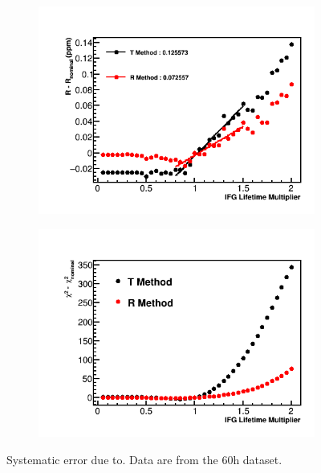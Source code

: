 \begin{figure}[h]
\centering
    \begin{subfigure}[t]{0.45\textwidth}
        \centering
        \includegraphics[width=\textwidth]{IFG_Lifetime_Compare_R}
        \caption{}
    \end{subfigure}%
    \hspace{1cm}
    \begin{subfigure}[t]{0.45\textwidth}
        \centering
        \includegraphics[width=\textwidth]{IFG_Lifetime_Compare_Chisq}
        \caption{}
    \end{subfigure}
\caption[Systematic error due to]{Systematic error due to. Data are from the 60h dataset.}
\label{fig:IFGAmpscan}
\end{figure}


